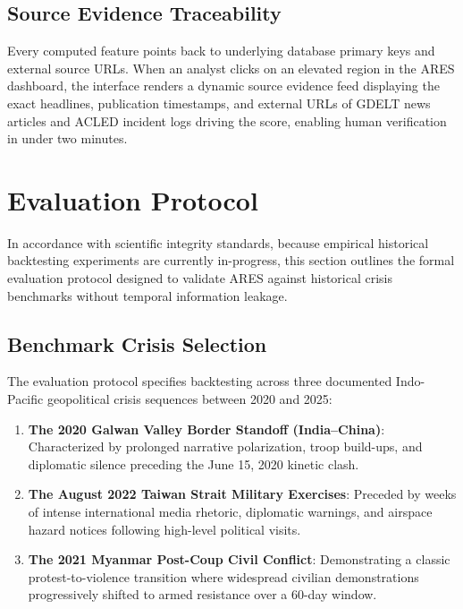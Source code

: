 \documentclass[preprint,12pt]{elsarticle}
\begin{document}
\subsection{Source Evidence Traceability}
Every computed feature points back to underlying database primary keys and external source URLs. When an analyst clicks on an elevated region in the ARES dashboard, the interface renders a dynamic source evidence feed displaying the exact headlines, publication timestamps, and external URLs of GDELT news articles and ACLED incident logs driving the score, enabling human verification in under two minutes.

\section{Evaluation Protocol}
\label{sec:eval}

In accordance with scientific integrity standards, because empirical historical backtesting experiments are currently in-progress, this section outlines the formal evaluation protocol designed to validate ARES against historical crisis benchmarks without temporal information leakage.

\subsection{Benchmark Crisis Selection}
The evaluation protocol specifies backtesting across three documented Indo-Pacific geopolitical crisis sequences between 2020 and 2025:
\begin{enumerate}
    \item \textbf{The 2020 Galwan Valley Border Standoff (India--China)}: Characterized by prolonged narrative polarization, troop build-ups, and diplomatic silence preceding the June 15, 2020 kinetic clash.
    \item \textbf{The August 2022 Taiwan Strait Military Exercises}: Preceded by weeks of intense international media rhetoric, diplomatic warnings, and airspace hazard notices following high-level political visits.
    \item \textbf{The 2021 Myanmar Post-Coup Civil Conflict}: Demonstrating a classic protest-to-violence transition where widespread civilian demonstrations progressively shifted to armed resistance over a 60-day window.
\end{enumerate}
\end{document}
